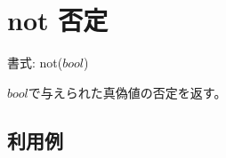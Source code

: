 
%

\section{not 否定\label{sect:not}}

書式: not($bool$)

$bool$で与えられた真偽値の否定を返す。

\subsection*{利用例}


%

